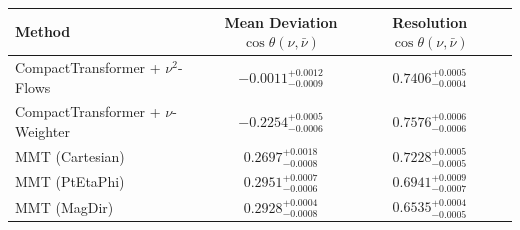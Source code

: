     \begin{tabular}{lccc}
        \toprule
        Method & Mean Deviation $\cos\theta(\nu, \bar{\nu})$ & Resolution $\cos\theta(\nu, \bar{\nu})$ \\
        \midrule
        CompactTransformer + $\nu^2$-Flows & $-0.0011^{+0.0012}_{-0.0009}$ & $0.7406^{+0.0005}_{-0.0004}$ \\
        CompactTransformer + $\nu$-Weighter & $-0.2254^{+0.0005}_{-0.0006}$ & $0.7576^{+0.0006}_{-0.0006}$ \\
        MMT (Cartesian) & $0.2697^{+0.0018}_{-0.0008}$ & $0.7228^{+0.0005}_{-0.0005}$ \\
        MMT (PtEtaPhi) & $0.2951^{+0.0007}_{-0.0006}$ & $0.6941^{+0.0009}_{-0.0007}$ \\
        MMT (MagDir) & $0.2928^{+0.0004}_{-0.0008}$ & $0.6535^{+0.0004}_{-0.0005}$ \\
        \bottomrule
    \end{tabular}